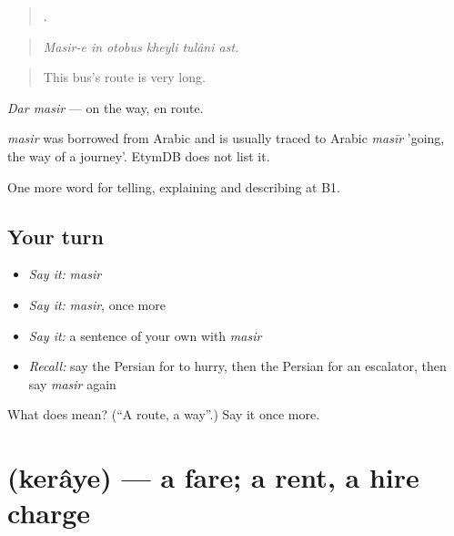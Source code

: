 \begin{quote}
     .
\end{quote}

\begin{quote}
\emph{Masir-e in otobus kheyli tulâni ast.}
\end{quote}

\begin{quote}
This bus's route is very long.
\end{quote}

\emph{Dar masir} — on the way, en route.

\begin{cousinweb}
\emph{masir} was borrowed from Arabic and is usually traced to Arabic \emph{masīr} 'going, the way of a journey'. EtymDB does not list it.
\end{cousinweb}

\begin{grammarlens}[title={What you've built}]
One more word for telling, explaining and describing at B1.
\end{grammarlens}

\subsection*{Your turn}
\begin{itemize}
\raggedright
  \item \emph{Say it:} \emph{masir}
  \item \emph{Say it:} \emph{masir}, once more
  \item \emph{Say it:} a sentence of your own with \emph{masir}
  \item \emph{Recall:} say the Persian for to hurry, then the Persian for an escalator, then say \emph{masir} again
\end{itemize}

\begin{tcolorbox}[breakable,colback=teal!4,colframe=teal!35!black,title={Before you move on}]
What does  mean? (\textquotedblleft{}A route, a way\textquotedblright{}.) Say it once more.
\end{tcolorbox}
\section[\texorpdfstring{\fa{کرایه} (kerâye)}{کرایه (kerâye)}]{ (kerâye) — a fare; a rent, a hire charge}

\label{lesson:FA-C434-keraye}



